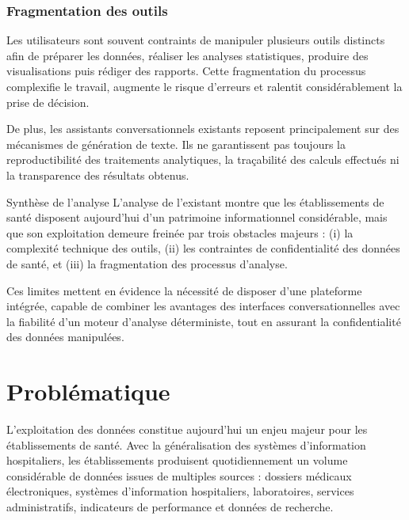 \subsubsection*{Fragmentation des outils}

Les utilisateurs sont souvent contraints de manipuler plusieurs outils distincts afin de préparer les données, réaliser les analyses statistiques, produire des visualisations puis rédiger des rapports. Cette fragmentation du processus complexifie le travail, augmente le risque d'erreurs et ralentit considérablement la prise de décision.

De plus, les assistants conversationnels existants reposent principalement sur des mécanismes de génération de texte. Ils ne garantissent pas toujours la reproductibilité des traitements analytiques, la traçabilité des calculs effectués ni la transparence des résultats obtenus.

\begin{infobox}{Synthèse de l'analyse}
L'analyse de l'existant montre que les établissements de santé disposent aujourd'hui d'un patrimoine informationnel considérable, mais que son exploitation demeure freinée par trois obstacles majeurs : (i) la complexité technique des outils, (ii) les contraintes de confidentialité des données de santé, et (iii) la fragmentation des processus d'analyse.

Ces limites mettent en évidence la nécessité de disposer d'une plateforme intégrée, capable de combiner les avantages des interfaces conversationnelles avec la fiabilité d'un moteur d'analyse déterministe, tout en assurant la confidentialité des données manipulées.
\end{infobox}

\section{Problématique}

L'exploitation des données constitue aujourd'hui un enjeu majeur pour les établissements de santé. Avec la généralisation des systèmes d'information hospitaliers, les établissements produisent quotidiennement un volume considérable de données issues de multiples sources : dossiers médicaux électroniques, systèmes d'information hospitaliers, laboratoires, services administratifs, indicateurs de performance et données de recherche.

